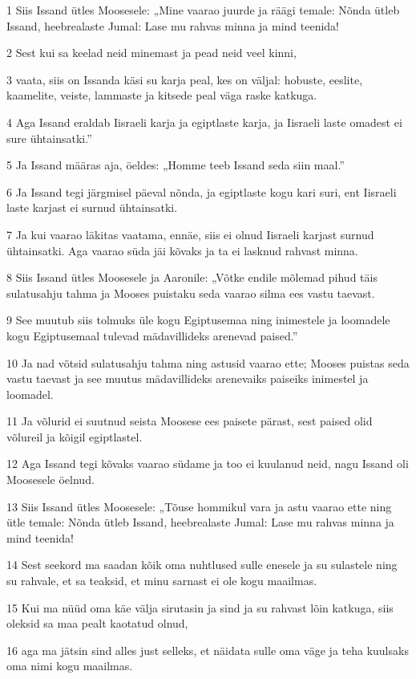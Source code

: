 \par 1 Siis Issand ütles Moosesele: „Mine vaarao juurde ja räägi temale: Nõnda ütleb Issand, heebrealaste Jumal: Lase mu rahvas minna ja mind teenida!
\par 2 Sest kui sa keelad neid minemast ja pead neid veel kinni,
\par 3 vaata, siis on Issanda käsi su karja peal, kes on väljal: hobuste, eeslite, kaamelite, veiste, lammaste ja kitsede peal väga raske katkuga.
\par 4 Aga Issand eraldab Iisraeli karja ja egiptlaste karja, ja Iisraeli laste omadest ei sure ühtainsatki.”
\par 5 Ja Issand määras aja, öeldes: „Homme teeb Issand seda siin maal.”
\par 6 Ja Issand tegi järgmisel päeval nõnda, ja egiptlaste kogu kari suri, ent Iisraeli laste karjast ei surnud ühtainsatki.
\par 7 Ja kui vaarao läkitas vaatama, ennäe, siis ei olnud Iisraeli karjast surnud ühtainsatki. Aga vaarao süda jäi kõvaks ja ta ei lasknud rahvast minna.
\par 8 Siis Issand ütles Moosesele ja Aaronile: „Võtke endile mõlemad pihud täis sulatusahju tahma ja Mooses puistaku seda vaarao silma ees vastu taevast.
\par 9 See muutub siis tolmuks üle kogu Egiptusemaa ning inimestele ja loomadele kogu Egiptusemaal tulevad mädavillideks arenevad paised.”
\par 10 Ja nad võtsid sulatusahju tahma ning astusid vaarao ette; Mooses puistas seda vastu taevast ja see muutus mädavillideks arenevaiks paiseiks inimestel ja loomadel.
\par 11 Ja võlurid ei suutnud seista Moosese ees paisete pärast, sest paised olid võlureil ja kõigil egiptlastel.
\par 12 Aga Issand tegi kõvaks vaarao südame ja too ei kuulanud neid, nagu Issand oli Moosesele öelnud.
\par 13 Siis Issand ütles Moosesele: „Tõuse hommikul vara ja astu vaarao ette ning ütle temale: Nõnda ütleb Issand, heebrealaste Jumal: Lase mu rahvas minna ja mind teenida!
\par 14 Sest seekord ma saadan kõik oma nuhtlused sulle enesele ja su sulastele ning su rahvale, et sa teaksid, et minu sarnast ei ole kogu maailmas.
\par 15 Kui ma nüüd oma käe välja sirutasin ja sind ja su rahvast lõin katkuga, siis oleksid sa maa pealt kaotatud olnud,
\par 16 aga ma jätsin sind alles just selleks, et näidata sulle oma väge ja teha kuulsaks oma nimi kogu maailmas.
